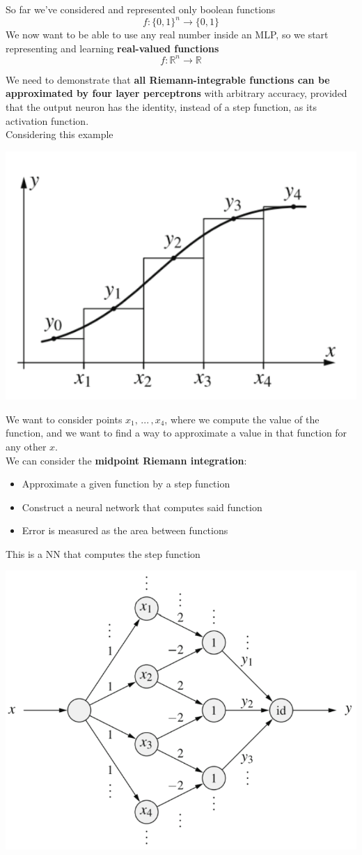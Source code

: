 \documentclass[11pt]{article}
\begin{document}
		So far we've considered and represented only boolean functions 
		$$ f: \{0,1\}^n \rightarrow \{0,1\} $$
		We now want to be able to use any real number inside an MLP, so we start representing and learning \textbf{real-valued functions}
		$$ f: \mathbb{R}^n \rightarrow \mathbb{R} $$
		
		We need to demonstrate that \textbf{all Riemann-integrable functions can be approximated by four layer perceptrons} with arbitrary accuracy, provided that the output neuron has the identity, instead of a step function, as its activation function.\\
		
		Considering this example
		\begin{center}
			\includegraphics[width=0.5\columnwidth]{img/NN/func1}
		\end{center}
		We want to consider points $x_1, \, ... \, , x_4$, where we compute the value of the function, and we want to find a way to approximate a value in that function for any other $x$.\\
		
		We can consider the \textbf{midpoint Riemann integration}: 
		\begin{itemize}
			\item Approximate a given function by a step function
			\item Construct a neural network that computes said function 
			\item Error is measured as the area between functions
		\end{itemize}
		
		\newpage
		
		This is a NN that computes the step function
		\begin{center}
			\includegraphics[width=0.7\columnwidth]{img/NN/NN2}
		\end{center}
		
\end{document}
